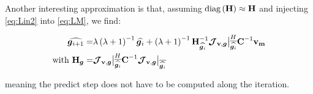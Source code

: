 Another interesting approximation is that, assuming
$\text{diag}\left(\textbf{H}\right)\approx\textbf{H}$ and injecting \ref{eq:Lin2} into \ref{eq:LM}, we find:

\def\Fact{\left(\lambda+1\right)^{-1}}
\def\ThisJ{\JVg\big|_{\conj{\widehat{\g_{i}}}}}
\begin{alignat}{2}
\label{eq:HalfLM}
\widehat{\vec{g}_{i+1}}=&\lambda\Fact\widehat{\vec{g}_{i}}+\Fact\H_{\widehat{\vec{g}_{i}}}^{-1}\ThisJ^H\textbf{C}^{-1}\mathbf{v_m}\\
\text{with }\H_{\vec{g}}=&\ThisJ^H\textbf{C}^{-1}\ThisJ
\end{alignat}

\noindent meaning the predict step does not have to be computed along
the iteration.





